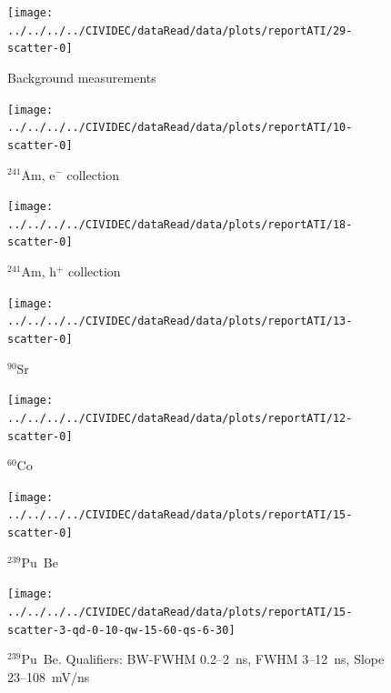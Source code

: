 \documentclass[12pt]{packages/mytustyle}  %
\begin{document}
\clearpage
\begin{figure}[!t]
\centering
\texttt{[image: ../../../../CIVIDEC/dataRead/data/plots/reportATI/29-scatter-0]}
\caption{Background measurements}
\label{fig:scatterbm}
\end{figure}

\clearpage
\begin{figure}[!t]
\centering
\texttt{[image: ../../../../CIVIDEC/dataRead/data/plots/reportATI/10-scatter-0]}
\caption{$^{241}$Am, e$^{-}$ collection}
\label{fig:scatterae}
\end{figure}

\clearpage
\begin{figure}[!t]
\centering
\texttt{[image: ../../../../CIVIDEC/dataRead/data/plots/reportATI/18-scatter-0]}
\caption{$^{241}$Am, h$^{+}$ collection}
\label{fig:scatterah}
\end{figure}

\clearpage
\begin{figure}[!t]
\centering
\texttt{[image: ../../../../CIVIDEC/dataRead/data/plots/reportATI/13-scatter-0]}
\caption{$^{90}$Sr}
\label{fig:scattersr}
\end{figure}

\clearpage
\begin{figure}[!t]
\centering
\texttt{[image: ../../../../CIVIDEC/dataRead/data/plots/reportATI/12-scatter-0]}
\caption{$^{60}$Co}
\label{fig:scatterco}
\end{figure}




\clearpage
\begin{figure}[!t]
\centering
\texttt{[image: ../../../../CIVIDEC/dataRead/data/plots/reportATI/15-scatter-0]}
\caption{$^{239}$Pu~Be}
\label{fig:scatterpu}
\end{figure}


\clearpage
\begin{figure}[!t]
\centering
\texttt{[image: ../../../../CIVIDEC/dataRead/data/plots/reportATI/15-scatter-3-qd-0-10-qw-15-60-qs-6-30]}
\caption{$^{239}$Pu~Be. Qualifiers: BW-FWHM 0.2--2~ns, FWHM 3--12~ns, Slope 23--108~mV/ns}
\label{fig:scatterpuq1}
\end{figure}
\end{document}
